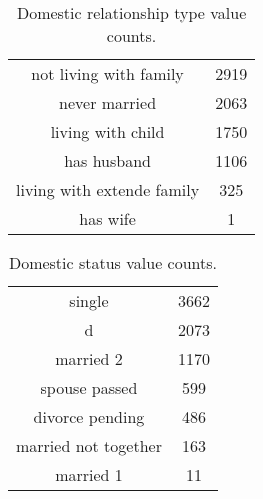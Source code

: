 \begin{table}[!h]
    \caption{Domestic relationship type value counts.}
    \label{tab:domestic_relationship_type_value_counts}
    \centering
    \begin{tabular}{cc}
        not living with family & 2919 \\
        never married & 2063 \\
        living with child & 1750 \\
        has husband & 1106 \\
        living with extende family & 325 \\
        has wife & 1 \\
    \end{tabular}
\end{table}

\begin{table}[!h]
    \caption{Domestic status value counts.}
    \label{tab:domestic_status_value_counts}
    \begin{tabular}{cc}
        single & 3662 \\
        d & 2073 \\
        married 2 & 1170 \\
        spouse passed & 599 \\
        divorce pending & 486 \\
        married not together & 163 \\
        married 1 & 11 \\
    \end{tabular}
    \centering
\end{table}

